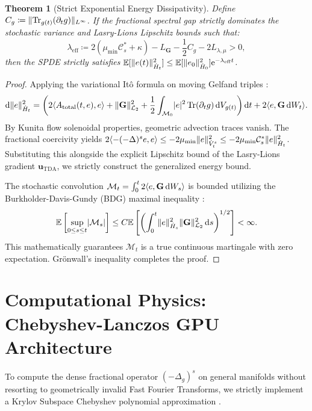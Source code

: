 \documentclass[11pt,a4paper]{article}
\newcommand*{\diff}{\mathop{}\!\mathrm{d}}
\newcommand*{\ee}{\mathrm{e}}
\newcommand*{\E}{\mathbb{E}}
\newcommand*{\M}{\mathcal{M}}
\DeclarePairedDelimiter{\norm}{\lVert}{\rVert}
\DeclarePairedDelimiter{\abs}{\lvert}{\rvert}
\DeclarePairedDelimiter{\inner}{\langle}{\rangle}
\DeclareMathOperator{\Tr}{Tr}
\theoremstyle{plain}
\newtheorem{theorem}{Theorem}[section]
\theoremstyle{definition}
\theoremstyle{remark}
\begin{document}
\begin{theorem}[Strict Exponential Energy Dissipativity]
\label{thm:master}
Define $C_g \coloneqq \norm{\Tr_{g(t)}(\partial_t g)}_{L^\infty}$. If the fractional spectral gap strictly dominates the stochastic variance and Lasry-Lions Lipschitz bounds such that:
\begin{equation}
    \lambda_{\mathrm{eff}} \coloneqq 2 \left( \mu_{\min} \mathcal{C}_s^* + \kappa \right) - L_{\mathbf{G}} - \frac{1}{2} C_g - 2 L_{\lambda,\mu} > 0,
\end{equation}
then the SPDE strictly satisfies $\E[\norm{e(t)}_{\dot{H}_t}^2] \le \E[\norm{e_0}_{\dot{H}_0}^2] \ee^{-\lambda_{\mathrm{eff}} t}$.
\end{theorem}
\begin{proof}
Applying the variational It\^{o} formula on moving Gelfand triples \cite{Schnaubelt2012}:
\begin{equation}
    \diff \norm{e}_{\dot{H}_t}^2 = \left( 2 \inner{A_{\mathrm{total}}(t,e), e} + \norm{\mathbf{G}}_{\mathcal{L}_2}^2 + \frac{1}{2} \int_{\M_0} \abs{e}^2 \Tr(\partial_t g) \diff V_{g(t)} \right) \diff t + 2 \inner{e, \mathbf{G} \diff W_t}.
\end{equation}
By Kunita flow solenoidal properties, geometric advection traces vanish. The fractional coercivity yields $2\inner{-(-\Delta)^s e, e} \le -2\mu_{\min} \norm{e}_{\dot{V}_t^s}^2 \le -2\mu_{\min}\mathcal{C}_s^* \norm{e}_{\dot{H}_t}^2$. Substituting this alongside the explicit Lipschitz bound of the Lasry-Lions gradient $\mathbf{u}_{\mathrm{TDA}}$, we strictly construct the generalized energy bound. 

The stochastic convolution $\M_t = \int_0^t 2 \inner{e, \mathbf{G} \diff W_s}$ is bounded utilizing the Burkholder-Davis-Gundy (BDG) maximal inequality \cite{Hairer2009}:
\begin{equation}
    \E\left[\sup_{0 \le s \le t} \abs{\M_s}\right] \le C \E\left[ \left( \int_0^t \norm{e}_{\dot{H}_s}^2 \norm{\mathbf{G}}_{\mathcal{L}_2}^2 \diff s \right)^{1/2} \right] < \infty.
\end{equation}
This mathematically guarantees $\M_t$ is a true continuous martingale with zero expectation. Gr\"{o}nwall's inequality completes the proof.
\end{proof}

\section{Computational Physics: Chebyshev-Lanczos GPU Architecture}
To compute the dense fractional operator $(-\Delta_g)^s$ on general manifolds without resorting to geometrically invalid Fast Fourier Transforms, we strictly implement a Krylov Subspace Chebyshev polynomial approximation \cite{Saad1992, Higham2008}.
\end{document}
